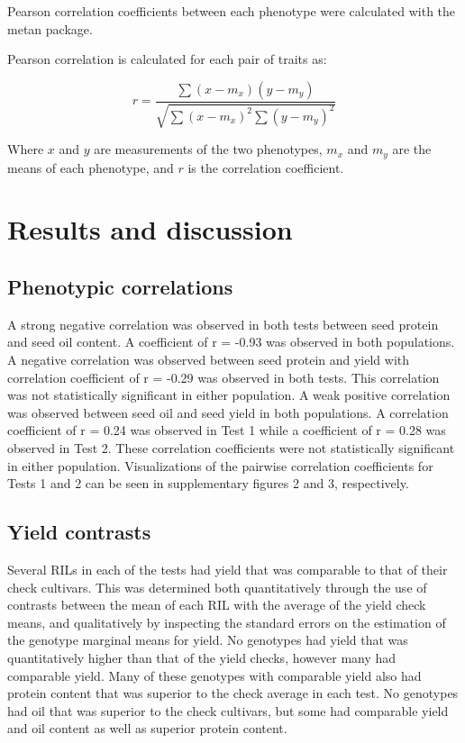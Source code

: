 \documentclass[Agronomy,article,submit,moreauthors,pdftex]{mdpi}
\begin{document}
Pearson correlation coefficients between each phenotype were calculated
with the metan package.

Pearson correlation is calculated for each pair of traits as:

\[r = \frac{\sum{(x-m_x)(y-m_y)}}{\sqrt{\sum{(x-m_x)^2}\sum{(y-m_y)^2}}}\]

Where \(x\) and \(y\) are measurements of the two phenotypes, \(m_x\)
and \(m_y\) are the means of each phenotype, and \(r\) is the
correlation coefficient.

\hypertarget{results-and-discussion}{%
\section{Results and discussion}\label{results-and-discussion}}

\hypertarget{phenotypic-correlations}{%
\subsection{Phenotypic correlations}\label{phenotypic-correlations}}

A strong negative correlation was observed in both tests between seed
protein and seed oil content. A coefficient of r = -0.93 was observed in
both populations. A negative correlation was observed between seed
protein and yield with correlation coefficient of r = -0.29 was observed
in both tests. This correlation was not statistically significant in
either population. A weak positive correlation was observed between seed
oil and seed yield in both populations. A correlation coefficient of r =
0.24 was observed in Test 1 while a coefficient of r = 0.28 was observed
in Test 2. These correlation coefficients were not statistically
significant in either population. Visualizations of the pairwise
correlation coefficients for Tests 1 and 2 can be seen in supplementary
figures 2 and 3, respectively.

\hypertarget{yield-contrasts}{%
\subsection{Yield contrasts}\label{yield-contrasts}}

Several RILs in each of the tests had yield that was comparable to that
of their check cultivars. This was determined both quantitatively
through the use of contrasts between the mean of each RIL with the
average of the yield check means, and qualitatively by inspecting the
standard errors on the estimation of the genotype marginal means for
yield. No genotypes had yield that was quantitatively higher than that
of the yield checks, however many had comparable yield. Many of these
genotypes with comparable yield also had protein content that was
superior to the check average in each test. No genotypes had oil that
was superior to the check cultivars, but some had comparable yield and
oil content as well as superior protein content.
\end{document}
